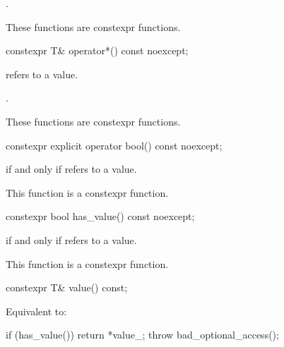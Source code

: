   \begin{itemdescr}
    \pnum
    \returns
    .

    \pnum
    \remarks
    These functions are constexpr functions.
  \end{itemdescr}

  \begin{itemdecl}
    constexpr T&  operator*() const noexcept;
  \end{itemdecl}

  \begin{itemdescr}
    \pnum
    \expects
     refers to a value.

    \pnum
    \returns
    .

    \pnum
    \remarks
    These functions are constexpr functions.
  \end{itemdescr}

  \begin{itemdecl}
    constexpr explicit operator bool() const noexcept;
  \end{itemdecl}

  \begin{itemdescr}
    \pnum
    \returns
     if and only if  refers to a value.

    \pnum
    \remarks
    This function is a constexpr function.
  \end{itemdescr}

  \begin{itemdecl}
    constexpr bool has_value() const noexcept;
  \end{itemdecl}

  \begin{itemdescr}
    \pnum
    \returns
     if and only if  refers to a value.

    \pnum
    \remarks
    This function is a constexpr function.
  \end{itemdescr}

  \begin{itemdecl}
    constexpr T& value() const;
  \end{itemdecl}

  \begin{itemdescr}
    \pnum
    \effects
    Equivalent to:
    \begin{codeblock}
      if (has_value())
          return *value_;
      throw bad_optional_access();
    \end{codeblock}
  \end{itemdescr}

